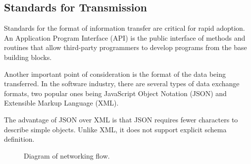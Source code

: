 \subsection{Standards for Transmission}

Standards for the format of information transfer are critical for rapid
adoption. An Application  Program Interface (API) is the public
interface of methods and routines that allow third-party programmers to
develop programs from the base building blocks. 

Another important point of consideration is the format of the data being
transferred. In the software industry, there are several types of data
exchange formats, two popular ones being JavaScript Object Notation
(JSON) and Extensible Markup Language (XML). 

The advantage of JSON over XML is that JSON requires fewer characters to
describe simple objects. Unlike XML, it does not support explicit schema
definition. 

\begin{figure}
\caption{Diagram of networking flow.}
\label{fig:NetworkFlow}
\end{figure}


